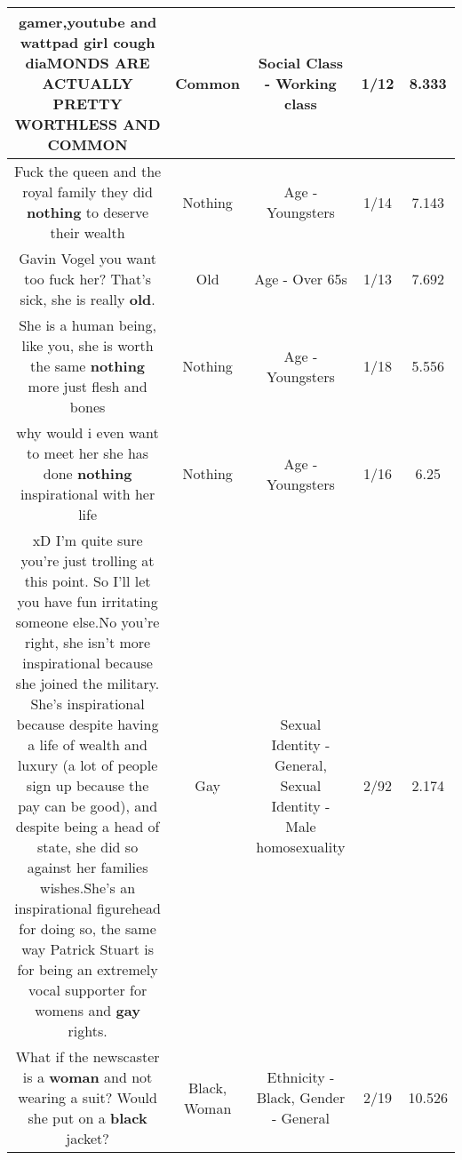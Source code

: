 \documentclass[11pt]{article}
\newlength\mylength
\begin{document}
\begin{center}
\begin{longtable}{|C{.65\mylength}|C{.30\mylength}|C{.12\mylength}|C{.12\mylength}|C{.12\mylength}|}
  \small gamer,youtube and wattpad girl cough diaMONDS ARE ACTUALLY PRETTY WORTHLESS AND COMMON\normalsize   & Common & Social Class - Working class & 1/12 & 8.333 \\  \hline
  \small Fuck the queen and the royal family they did \textbf{nothing} to deserve their wealth\normalsize   & Nothing & Age - Youngsters & 1/14 & 7.143 \\  \hline
  \small Gavin Vogel you want too fuck her? That's sick, she is really \textbf{old}.\normalsize   & Old & Age - Over 65s & 1/13 & 7.692 \\  \hline
  \small She is a human being, like you, she is worth the same \textbf{nothing} more just flesh and bones\normalsize   & Nothing & Age - Youngsters & 1/18 & 5.556 \\  \hline
  \small why would i even want to meet her she has done \textbf{nothing} inspirational with her life\normalsize   & Nothing & Age - Youngsters & 1/16 & 6.25 \\  \hline
  \small xD I'm quite sure you're just trolling at this point. So I'll let you have fun irritating someone else.No you're right, she isn't more inspirational because she joined the military. She's inspirational because despite having a life of wealth and luxury (a lot of people sign up because the pay can be good), and despite being a head of state, she did so against her families wishes.She's an inspirational figurehead for doing so, the same way Patrick Stuart is for being an extremely vocal supporter for womens and \textbf{g\textbf{ay}} rights.\normalsize   & Gay & Sexual Identity - General, Sexual Identity - Male homosexuality & 2/92 & 2.174 \\  \hline
  \small What if the newscaster is a \textbf{woman} and not wearing a suit? Would she put on a \textbf{black} jacket?\normalsize   & Black, Woman & Ethnicity - Black, Gender - General & 2/19 & 10.526 \\  \hline

\end{longtable}
\end{center}
\end{document}
